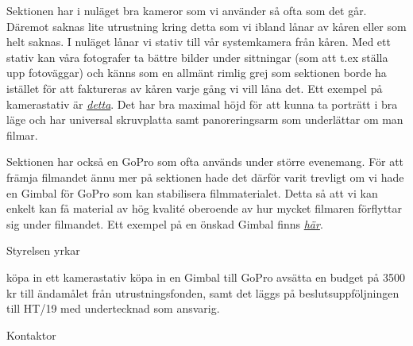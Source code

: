 \documentclass[../_main/handlingar.tex]{subfiles}
\begin{document}


Sektionen har i nuläget bra kameror som vi använder så ofta som det går. Däremot saknas lite utrustning kring detta som vi ibland lånar av kåren eller som helt saknas. 
I nuläget lånar vi stativ till vår systemkamera från kåren. Med ett stativ kan våra fotografer ta bättre bilder under sittningar (som att t.ex ställa upp fotoväggar) 
och känns som en allmänt rimlig grej som sektionen borde ha istället för att faktureras av kåren varje gång vi vill låna det. Ett exempel på kamerastativ är \href{https://www.elgiganten.se/product/foto-video/tillbehor-systemkamera/VELBONS200/velbon-sherpa-200-stativ}{\textit{detta}}. 
Det har bra maximal höjd för att kunna ta porträtt i bra läge och har universal skruvplatta samt panoreringsarm som underlättar om man filmar.

Sektionen har också en GoPro som ofta används under större evenemang. För att främja filmandet ännu mer på sektionen hade det därför varit trevligt om vi hade en Gimbal för GoPro som kan stabilisera filmmaterialet. 
Detta så att vi kan enkelt kan få material av hög kvalité oberoende av hur mycket filmaren förflyttar sig under filmandet. Ett exempel på en önskad Gimbal finns \href{https://www.dustinhome.se/product/5011088351/g6-splash-proof-gimbal}{\textit{här}}.

Styrelsen yrkar

\begin{attsatser}
\att köpa in ett kamerastativ
\att köpa in en Gimbal till GoPro
\att avsätta en budget på 3500 kr till ändamålet från utrustningsfonden, samt
\att det läggs på beslutsuppföljningen till HT/19 med undertecknad som ansvarig.

\end{attsatser}

\begin{signatures}{1}
    \ist
    \signature{\sekr}{Kontaktor}
\end{signatures}
\end{document}
